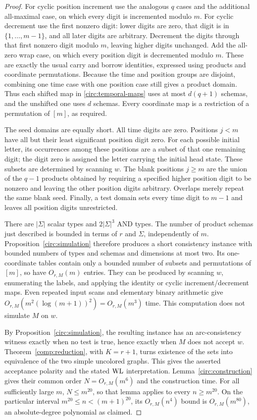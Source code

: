 \begin{proof}
For cyclic position increment use the analogous $q$ cases and the
additional all-maximal case, on which every digit is incremented modulo
$m$. For cyclic decrement use the first nonzero digit: lower digits are
zero, that digit is in $\{1,\ldots,m-1\}$, and all later digits are
arbitrary. Decrement the digits through that first nonzero digit modulo
$m$, leaving higher digits unchanged. Add the all-zero wrap case, on which
every position digit is decremented modulo $m$. These are
exactly the usual carry and borrow identities, expressed using products and
coordinate permutations. Because the time and position groups are disjoint,
combining one time case with one position case still gives a product
domain. Thus each shifted map in \eqref{circ:temporal-maps} uses at most
$d(q+1)$ schemas, and the unshifted one uses $d$ schemas. Every coordinate
map is a restriction of a permutation of $[m]$, as required.

The seed domains are equally short. All time digits are zero. Positions
$j<m$ have all but their least significant position digit zero. For each
possible initial letter, its occurrences among these positions are a
subset of that one remaining digit; the digit zero is assigned the letter
carrying the initial head state. These subsets are determined by scanning
$w$. The blank positions $j\geq m$ are the union of the $q-1$ products
obtained by requiring a specified higher position digit to be nonzero and
leaving the other position digits arbitrary. Overlaps merely repeat the
same blank seed. Finally, a test domain sets every time digit to $m-1$ and
leaves all position digits unrestricted.

There are $|\Sigma|$ scalar types and $2|\Sigma|^3$ AND types. The number
of product schemas just described is bounded in terms of $r$ and $\Sigma$,
independently of $m$. Proposition~\ref{circ:simulation} therefore produces
a short consistency instance with bounded numbers of types and schemas and
dimensions at most two. Its one-coordinate tables contain only a bounded
number of subsets and permutations of $[m]$, so have $O_{r,M}(m)$ entries.
They can be produced by scanning $w$, enumerating the labels, and applying
the identity or cyclic increment/decrement maps. Even repeated input scans
and elementary binary arithmetic give
$O_{r,M}(m^2(\log(m+1))^2)=O_{r,M}(m^3)$ time. This computation does not
simulate $M$ on $w$.

By Proposition~\ref{circ:simulation}, the resulting instance has an
arc-consistency witness exactly when no test is true, hence exactly when
$M$ does not accept $w$.
Theorem~\ref{comp:reduction}, with $K=r+1$, turns existence of the sets into
equivalence of the two simple uncolored graphs. This gives the asserted
acceptance polarity and the stated $\mathrm{WL}$ interpretation.
Lemma~\ref{circ:construction} gives their common order
$N=O_{r,M}(m^6)$ and the construction time. For all sufficiently large $m$,
$N\leq m^{20}$, so that lemma applies to every $n\geq m^{20}$. On the
particular interval $m^{20}\leq n<(m+1)^{20}$, its $O_{r,M}(n^4)$ bound is
$O_{r,M}(m^{80})$, an absolute-degree polynomial as claimed.
\end{proof}
